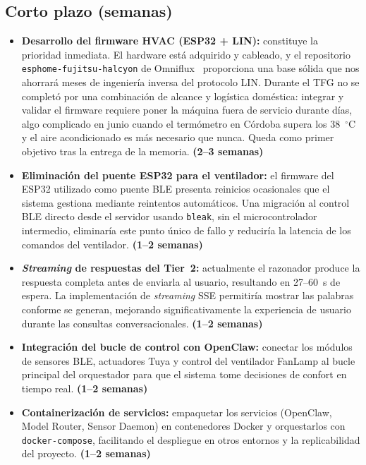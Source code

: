 \subsection*{Corto plazo (semanas)}
\begin{itemize}
    \item \textbf{Desarrollo del firmware HVAC (ESP32 + LIN):} constituye la prioridad inmediata. El hardware está adquirido y cableado, y el repositorio \texttt{esphome-fujitsu-halcyon} de Omniflux~\cite{omniflux_esphome_fujitsu} proporciona una base sólida que nos ahorrará meses de ingeniería inversa del protocolo LIN. Durante el TFG no se completó por una combinación de alcance y logística doméstica: integrar y validar el firmware requiere poner la máquina fuera de servicio durante días, algo complicado en junio cuando el termómetro en Córdoba supera los 38~$^\circ$C y el aire acondicionado es más necesario que nunca. Queda como primer objetivo tras la entrega de la memoria. \hfill \textbf{(2--3 semanas)}

    \item \textbf{Eliminación del puente ESP32 para el ventilador:} el firmware del ESP32 utilizado como puente BLE presenta reinicios ocasionales que el sistema gestiona mediante reintentos automáticos. Una migración al control BLE directo desde el servidor usando \texttt{bleak}, sin el microcontrolador intermedio, eliminaría este punto único de fallo y reduciría la latencia de los comandos del ventilador. \hfill \textbf{(1--2 semanas)}

    \item \textbf{\textit{Streaming} de respuestas del Tier~2:} actualmente el razonador produce la respuesta completa antes de enviarla al usuario, resultando en 27--60~s de espera. La implementación de \textit{streaming} SSE permitiría mostrar las palabras conforme se generan, mejorando significativamente la experiencia de usuario durante las consultas conversacionales. \hfill \textbf{(1--2 semanas)}

    \item \textbf{Integración del bucle de control con OpenClaw:} conectar los módulos de sensores BLE, actuadores Tuya y control del ventilador FanLamp al bucle principal del orquestador para que el sistema tome decisiones de confort en tiempo real. \hfill \textbf{(1--2 semanas)}

    \item \textbf{Containerización de servicios:} empaquetar los servicios (OpenClaw, Model Router, Sensor Daemon) en contenedores Docker y orquestarlos con \texttt{docker-compose}, facilitando el despliegue en otros entornos y la replicabilidad del proyecto. \hfill \textbf{(1--2 semanas)}
\end{itemize}


